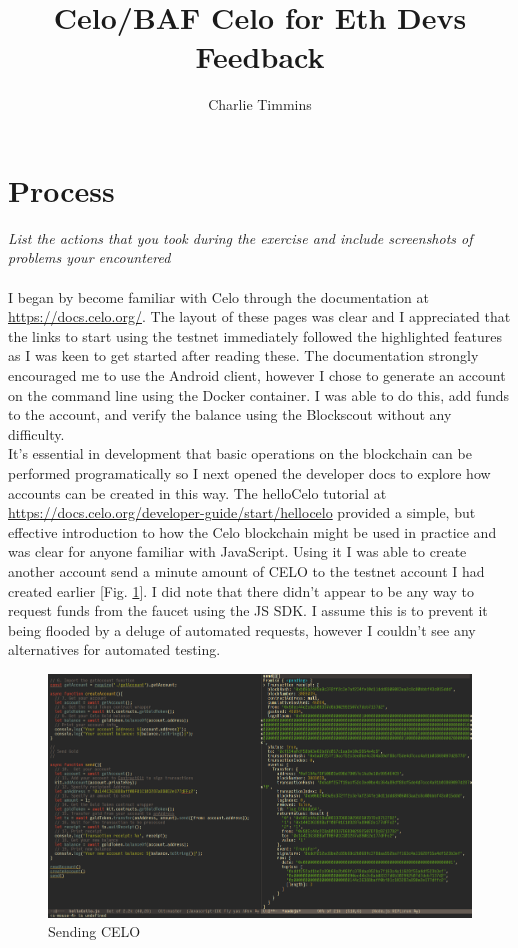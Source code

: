 \documentclass[a4paper,11pt]{article}
\title{Celo/BAF Celo for Eth Devs Feedback}
\author{Charlie Timmins}
\date{\begin{flushright}Jan. 2020\end{flushright}}
\begin{document}
\maketitle
\section*{Process}
\emph{List the actions that you took during the exercise and include screenshots
  of problems your encountered}
\\\\
I began by become familiar with Celo through the documentation at
\url{https://docs.celo.org/}.  The layout of these pages was clear and I
appreciated that the links to start using the testnet immediately followed the
highlighted features as I was keen to get started after reading these.  The
documentation strongly encouraged me to use the Android client, however I chose
to generate an account on the command line using the Docker container.  I was
able to do this, add funds to the account, and verify the balance using the
Blockscout without any difficulty.\\


It's essential in development that basic operations on the blockchain can be
performed programatically so I next opened the developer docs to explore how
accounts can be created in this way.  The helloCelo tutorial at
\url{https://docs.celo.org/developer-guide/start/hellocelo} provided a simple,
but effective introduction to how the Celo blockchain might be used in practice
and was clear for anyone familiar with JavaScript.  Using it I was able to
create another account send a minute amount of CELO to the testnet account I had
created earlier [Fig. \ref{fig:sending}].  I did note that there didn't appear
to be any way to request funds from the faucet using the JS SDK.  I assume this
is to prevent it being flooded by a deluge of automated requests, however I
couldn't see any alternatives for automated testing.\\

\begin{figure}[hbt!]
  \centering
  \includegraphics[width=\textwidth]{sending}
  \caption{Sending CELO}
  \label{fig:sending}
\end{figure}
\end{document}
